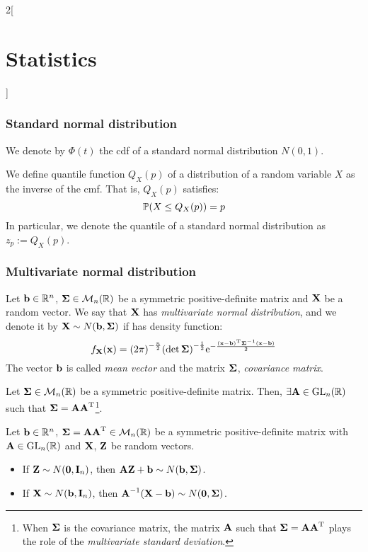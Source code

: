 \documentclass[../../../main.tex]{subfiles}
\begin{document}
\begin{multicols}{2}[\section{Statistics}]
  \subsubsection{Standard normal distribution}
  \begin{definition}
    We denote by $\Phi(t)$ the cdf of a standard normal distribution $N(0,1)$.
  \end{definition}
  \begin{definition}[Quantile]
    We define quantile function $Q_X(p)$ of a distribution of a random variable $X$ as the inverse of the cmf. That is, $Q_X(p)$ satisfies:
    $$\mathbb{P}(X\leq Q_X(p))=p$$
    In particular, we denote the quantile of a standard normal distribution as $z_p:=Q_X(p)$.
  \end{definition}
  \subsubsection{Multivariate normal distribution}
  \begin{definition}
    Let $\boldsymbol{\mathrm{b}}\in\mathbb{R}^n$, $\boldsymbol{\mathrm{\Sigma}}\in\mathcal{M}_n(\mathbb{R})$ be a symmetric positive-definite matrix and $\boldsymbol{\mathrm{X}}$ be a random vector. We say that $\boldsymbol{\mathrm{X}}$ has \emph{multivariate normal distribution}, and we denote it by $\boldsymbol{\mathrm{X}}\sim N(\boldsymbol{\mathrm{b}},\boldsymbol{\mathrm{\Sigma}})$ if has density function:
    $$f_{\boldsymbol{\mathrm{X}}}(\boldsymbol{\mathrm{x}})={(2\pi)}^{-\frac{n}{2}}{(\det\boldsymbol{\mathrm{\Sigma}})}^{-\frac{1}{2}}\mathrm{e}^{-\frac{\vb{(\boldsymbol{\mathrm{x}}-\boldsymbol{\mathrm{b}})}^{\mathrm{T}}{\boldsymbol{\mathrm{\Sigma}}}^{-1}(\boldsymbol{\mathrm{x}}-\boldsymbol{\mathrm{b}})}{2}}$$
    The vector $\boldsymbol{\mathrm{b}}$ is called \emph{mean vector} and the matrix $\boldsymbol{\mathrm{\Sigma}}$, \emph{covariance matrix}.
  \end{definition}
  \begin{proposition}
    Let $\boldsymbol{\mathrm{\Sigma}}\in\mathcal{M}_n(\mathbb{R})$ be a symmetric positive-definite matrix. Then, $\exists\boldsymbol{\mathrm{A}}\in\mathrm{GL}_n(\mathbb{R})$ such that $\boldsymbol{\mathrm{\Sigma}}=\boldsymbol{\mathrm{A}}\vb{\boldsymbol{\mathrm{A}}}^{\mathrm{T}}$\footnote{When $\boldsymbol{\mathrm{\Sigma}}$ is the covariance matrix, the matrix $\boldsymbol{\mathrm{A}}$ such that $\boldsymbol{\mathrm{\Sigma}}=\boldsymbol{\mathrm{A}}\vb{\boldsymbol{\mathrm{A}}}^{\mathrm{T}}$ plays the role of the \emph{multivariate standard deviation}.}.
  \end{proposition}
  \begin{proposition}
    Let $\boldsymbol{\mathrm{b}}\in\mathbb{R}^n$, $\boldsymbol{\mathrm{\Sigma}}=\boldsymbol{\mathrm{A}}\vb{\boldsymbol{\mathrm{A}}}^{\mathrm{T}}\in\mathcal{M}_n(\mathbb{R})$ be a symmetric positive-definite matrix with $\boldsymbol{\mathrm{A}}\in\mathrm{GL}_n(\mathbb{R})$ and $\boldsymbol{\mathrm{X}}$, $\boldsymbol{\mathrm{Z}}$ be random vectors.
    \begin{itemize}
      \item If $\boldsymbol{\mathrm{Z}}\sim N(\boldsymbol{\mathrm{0}},\boldsymbol{\mathrm{I}}_n)$, then $\boldsymbol{\mathrm{AZ}}+\boldsymbol{\mathrm{b}}\sim N(\boldsymbol{\mathrm{b}},\boldsymbol{\mathrm{\Sigma}})$.
      \item If $\boldsymbol{\mathrm{X}}\sim N(\boldsymbol{\mathrm{b}},\boldsymbol{\mathrm{I}}_n)$, then ${\boldsymbol{\mathrm{A}}}^{-1}(\boldsymbol{\mathrm{X}}-\boldsymbol{\mathrm{b}})\sim N(\boldsymbol{\mathrm{0}},\boldsymbol{\mathrm{\Sigma}})$.

\end{itemize}
\end{proposition}
\end{multicols}
\end{document}
